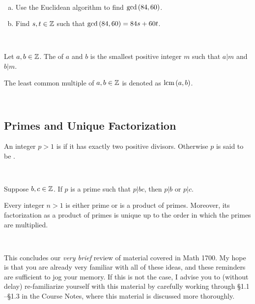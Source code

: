\documentclass[11pt,fleqn,dvipsnames,usenames]{article}
\newcommand{\p}{\noindent}
\begin{document}
%
\begin{example*}~
\begin{enumerate}[(a)]
\item Use the Euclidean algorithm to find $\text{gcd}\left(84,60\right)$.
\item Find $s,t\in\mathbb{Z}$ such that $\text{gcd}\left(84,60\right) = 84s + 60t$.
\end{enumerate}
\end{example*}
%
\begin{solution}~
\newpage

\end{solution}
%
\begin{definition*}
Let $a,b\in\mathbb{Z}$.  The  of $a$ and $b$ is the smallest positive integer $m$ such that $a|m$ and $b|m$.
\end{definition*}
%
\notation The least common multiple of $a,b\in\mathbb{Z}$ is denoted as $\text{lcm}\left(a,b\right)$.
\vsp

\begin{example*}~
\vspace{1cm}

\end{example*}

\subsection{Primes and Unique Factorization}

\begin{definition}
An integer $p > 1$ is  if it has exactly two positive divisors.  Otherwise $p$ is said to be .
\end{definition}
\vsmsp

\begin{example*}~
\vspace{1cm}

\end{example*}

\begin{theorem*}\label{euclidslemma}
Suppose $b,c\in\mathbb{Z}$.  If $p$ is a prime such that $p|bc$, then $p|b$ or $p|c$.
\end{theorem*}
%
\begin{theorem}
Every integer $n > 1$ is either prime or is a product of primes.  Moreover, its factorization as a product of primes is unique up to the order in which the primes are multiplied.
\end{theorem}
%
\begin{examples*}~
\vspace{5cm}

\end{examples*}

\p This concludes our \emph{very brief} review of material covered in Math 1700.  My hope is that you are already very familiar with all of these ideas, and these reminders are sufficient to jog your memory.  If this is not the case, I advise you to (without delay) re-familiarize yourself with this material by carefully working through \S 1.1 \nolinebreak --\nolinebreak  \S 1.3 in the Course Notes, where this material is discussed more thoroughly.
\end{document}
